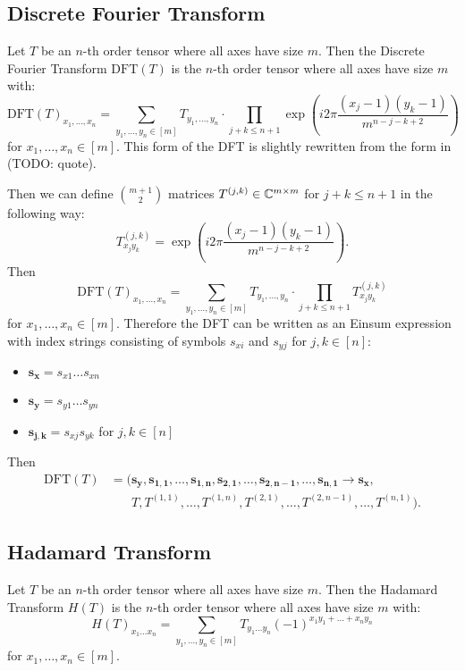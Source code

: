 \subsection{Discrete Fourier Transform}
Let $T$ be an $n$-th order tensor where all axes have size $m$.
Then the Discrete Fourier Transform $\text{DFT}(T)$ is the $n$-th order tensor where all axes have size $m$ with:
$$\text{DFT}(T)_{x_1,\dots,x_n} = \sum\limits_{y_1,\dots,y_n \in [m]} T_{y_1, \dots, y_n} \cdot \prod\limits_{j + k \leq n + 1} \exp(i2\pi \frac{(x_j - 1) (y_k - 1)}{m^{n - j - k + 2}})$$
for $x_1,\dots,x_n \in [m]$.
This form of the DFT is slightly rewritten from the form in (TODO: quote).

Then we can define $\binom{m + 1}{2}$ matrices $T^{(j,k)} \in \mathbb{C}^{m \times m}$ for $j + k \leq n + 1$ in the following way:
$$T^{(j,k)}_{x_j y_k} = \exp(i2\pi \frac{(x_j - 1) (y_k - 1)}{m^{n - j - k + 2}}).$$
Then
$$\text{DFT}(T)_{x_1,\dots,x_n} = \sum\limits_{y_1,\dots,y_n \in [m]} T_{y_1, \dots, y_n} \cdot \prod\limits_{j + k \leq n + 1} T^{(j,k)}_{x_j y_k}$$
for $x_1,\dots,x_n \in [m]$.
Therefore the DFT can be written as an Einsum expression with index strings consisting of symbols $s_{xi}$ and $s_{yj}$ for $j,k \in [n]$:
\begin{itemize}
    \item $\bm{s_x} = s_{x1}\dots s_{x n}$
    \item $\bm{s_y} = s_{y1}\dots s_{y n}$
    \item $\bm{s_{j,k}} = s_{xj} s_{yk}$ for $j,k \in [n]$
\end{itemize}
Then
\begin{align*}
    \text{DFT}(T) & = (\bm{s_y}, \bm{s_{1,1}}, \dots, \bm{s_{1,n}}, \bm{s_{2,1}}, \dots, \bm{s_{2,n - 1}}, \dots, \bm{s_{n, 1}} \rightarrow \bm{s_x}, \\
                  & \phantom{{}=(} T, T^{(1,1)}, \dots, T^{(1, n)}, T^{(2,1)}, \dots, T^{(2, n-1)}, \dots, T^{(n, 1)}).
\end{align*}


\subsection{Hadamard Transform}
Let $T$ be an $n$-th order tensor where all axes have size $m$.
Then the Hadamard Transform $H(T)$ is the $n$-th order tensor where all axes have size $m$ with:
$$H(T)_{x_1 \dots x_n} = \sum\limits_{y_1, \dots, y_n \in [m]} T_{y_1 \dots y_n} (-1)^{x_1 y_1 + \ldots + x_n y_n}$$
for $x_1,\dots,x_n \in [m]$.

